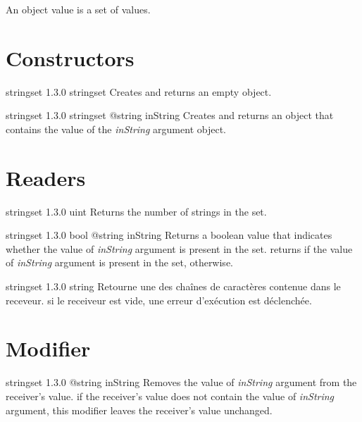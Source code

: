 

An  object value is a set of  values.\\

\section{Constructors}

{stringset}
{1.3.0}
{stringset}
{Creates and returns an empty  object.}
{}

{stringset}
{1.3.0}
{stringset}
{@string inString}
{Creates and returns an  object that contains the value of the \emph{inString} argument object.}
{}

\section{Readers}

{stringset}
{1.3.0}
{uint}
{Returns the number of strings in the set.}
{}



{stringset}
{1.3.0}
{bool}
{@string inString}
{Returns a boolean value that indicates whether the value of \emph{inString} argument is present in the set.}
{returns  if the value of \emph{inString} argument is present in the set,  otherwise.}


{stringset}
{1.3.0}
{string}
{Retourne une des chaînes de caractères contenue dans le receveur.}
{si le receiveur est vide, une erreur d'exécution est déclenchée.}




\section{Modifier}

{stringset}
{1.3.0}
{@string inString}
{Removes the value of \emph{inString} argument from the receiver's value.}
{if the receiver's value does not contain the value of \emph{inString} argument, this modifier leaves the receiver's value unchanged.}






